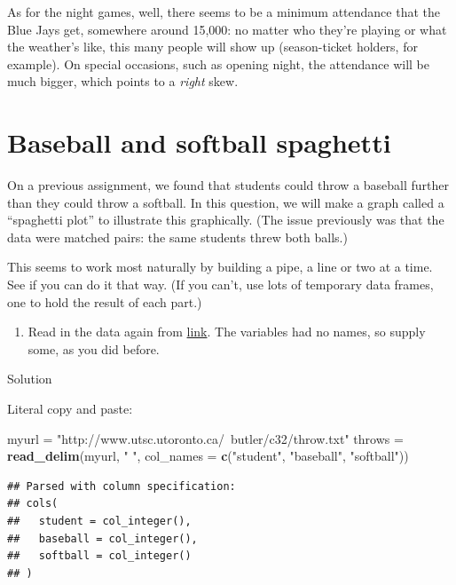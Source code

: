 \documentclass[]{tufte-book}
\newenvironment{Shaded}{}{}
\newcommand{\DataTypeTok}[1]{\textcolor[rgb]{0.56,0.13,0.00}{#1}}
\newcommand{\KeywordTok}[1]{\textcolor[rgb]{0.00,0.44,0.13}{\textbf{#1}}}
\newcommand{\NormalTok}[1]{#1}
\newcommand{\StringTok}[1]{\textcolor[rgb]{0.25,0.44,0.63}{#1}}
\providecommand{\tightlist}{%
  \setlength{\itemsep}{0pt}\setlength{\parskip}{0pt}}
\theoremstyle{definition}
\theoremstyle{definition}
\theoremstyle{definition}
\theoremstyle{remark}
\begin{document}
As for the night games, well, there seems to be a minimum attendance
that the Blue Jays get, somewhere around 15,000: no matter who they're
playing or what the weather's like, this many people will show up
(season-ticket holders, for example). On special occasions, such as
opening night, the attendance will be much bigger, which points to a
\emph{right} skew.

\hypertarget{baseball-and-softball-spaghetti}{%
\section{Baseball and softball
spaghetti}\label{baseball-and-softball-spaghetti}}

On a previous assignment, we found that students could throw a baseball
further than they could throw a softball. In this question, we will make
a graph called a ``spaghetti plot'' to illustrate this graphically. (The
issue previously was that the data were matched pairs: the same students
threw both balls.)

This seems to work most naturally by building a pipe, a line or two at a
time. See if you can do it that way. (If you can't, use lots of
temporary data frames, one to hold the result of each part.)

\begin{enumerate}
\def\labelenumi{(\alph{enumi})}
\tightlist
\item
  Read in the data again from
  \href{http://www.utsc.utoronto.ca/~butler/c32/throw.txt}{link}. The
  variables had no names, so supply some, as you did before.
\end{enumerate}

Solution

Literal copy and paste:

\begin{Shaded}
\begin{Highlighting}[]
\NormalTok{myurl =}\StringTok{ "http://www.utsc.utoronto.ca/~butler/c32/throw.txt"}
\NormalTok{throws =}\StringTok{ }\KeywordTok{read_delim}\NormalTok{(myurl, }\StringTok{" "}\NormalTok{, }\DataTypeTok{col_names =} \KeywordTok{c}\NormalTok{(}\StringTok{"student"}\NormalTok{, }
    \StringTok{"baseball"}\NormalTok{, }\StringTok{"softball"}\NormalTok{))}
\end{Highlighting}
\end{Shaded}

\begin{verbatim}
## Parsed with column specification:
## cols(
##   student = col_integer(),
##   baseball = col_integer(),
##   softball = col_integer()
## )
\end{verbatim}
\end{document}
